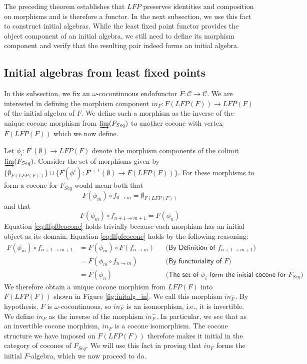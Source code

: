 \documentclass{msthesis}
\theoremstyle{definition}
\newcommand{\mcC}{\mathcal{C}}
\newcommand{\colim}{\varinjlim}
\begin{document}
The preceding theorem establishes that $LFP$ preserves identities and composition on morphisms and is therefore a functor. In the next subsection, we use this fact to construct initial algebras.  While the least fixed point functor provides the object component of an initial algebra, we still need to define its morphism component and verify that the resulting pair indeed forms an initial algebra.

\subsection{Initial algebras from least fixed points}\label{sec:initial_algebras_morphisms}

In this subsection, we fix an $\omega$-cocontinuous endofunctor $F : \mcC \to \mcC$.  We are interested in defining the morphism component $in_F : F(LFP(F)) \to LFP(F)$ of the initial algebra of $F$.  We define such a morphism as the inverse of the unique cocone morphism from $\colim(F_{Seq})$ to another cocone with vertex $F(LFP(F))$ which we now define.

Let $\phi_i : F^i(\emptyset) \to LFP(F)$ denote the morphism components of the colimit $\colim(F_{Seq})$.  Consider the set of morphisms given by $\{\emptyset_{F(LFP(F))}\} \cup \{ F(\phi^{i}) : F^{i+1}(\emptyset) \to F(LFP(F))\}$.  For these morphisms to form a cocone for $F_{Seq}$ would mean both that
\begin{equation}\label{eq:flfpf0cocone}
    F(\phi_m) \circ f_{0 \to m} = \emptyset_{F(LFP(F))}
\end{equation}
and that
\begin{equation}\label{eq:flfpfcocone}
    F(\phi_m) \circ f_{n+1\to m+1} = F(\phi_n)
\end{equation}
Equation \eqref{eq:flfpf0cocone} holds trivially because each morphism has an initial object as its domain.  Equation \eqref{eq:flfpfcocone} holds by the following reasoning:
\begin{align*}
    F(\phi_m) \circ f_{n+1\to m+1} &= F(\phi_m) \circ F(f_{n \to m})  && \textsf{(By Definition of $f_{n+1 \to m+1}$)} \\
    &= F(\phi_m \circ f_{n \to m})&& \textsf{(By functoriality of $F$)} \\
    &= F(\phi_n) &&\textsf{(The set of $\phi_i$ form the initial cocone for $F_{Seq}$)}
\end{align*}
We therefore obtain a unique cocone morphism from $LFP(F)$ into $F(LFP(F))$ shown in Figure \ref{fig:initalg_in}.  We call this morphism $in^-_F$.  By hypothesis, $F$ is $\omega$-cocontinuous, so $in^-_F$ is an isomorphism, i.e., it is invertible.  We define $in_F$ as the inverse of the morphism $in^-_F$.  In particular, we see that as an invertible cocone morphism, $in_F$ is a cocone isomorphism.  The cocone structure we have imposed on $F(LFP(F))$ therefore makes it initial in the category of cocones of $F_{Seq}$.  We will use this fact in proving that $in_F$ forms the initial $F$-algebra, which we now proceed to do.
\end{document}

